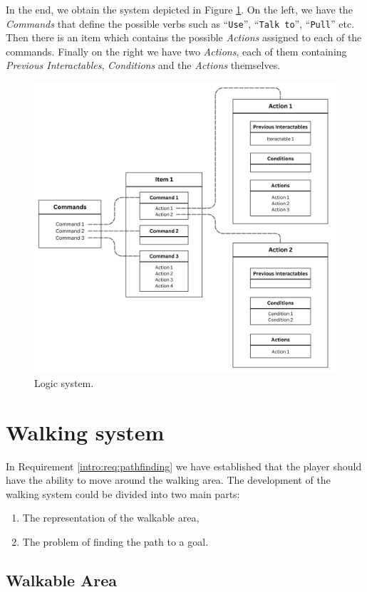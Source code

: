 In the end, we obtain the system depicted in Figure \ref{fig:Logic:Diagram}. On the left, we have the \textit{Commands} that define the possible verbs such as “\texttt{Use}”, “\texttt{Talk to}”, “\texttt{Pull}” etc. Then there is an item which contains the possible \textit{Actions} assigned to each of the commands. Finally on the right we have two \textit{Actions}, each of them containing \textit{Previous Interactables}, \textit{Conditions} and the \textit{Actions} themselves. 

\begin{figure}[H]
\centering
\includegraphics[width=0.8\linewidth]{img/Action-diagram.png}
\caption{Logic system.}
\label{fig:Logic:Diagram}
\end{figure}


\section{Walking system}
In Requirement \ref{intro:req:pathfinding}  we have established that the player should have the ability to move around the walking area. The development of the walking system could be divided into two main parts:
\begin{enumerate}
    \item The representation of the walkable area,
    \item The problem of finding the path to a goal.
\end{enumerate} 

\subsection{Walkable Area}
\label{analysis:walkableMap}


